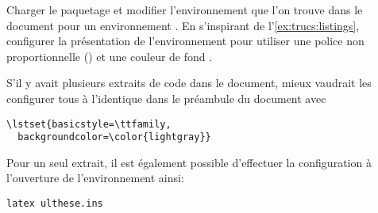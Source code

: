 \begin{exercice}
  \label{exercice:trucs:n}
  Charger le paquetage  et modifier l'environnement
   que l'on trouve dans le document pour un environnement
  . En s'inspirant de l'\autoref{ex:trucs:listings},
  configurer la présentation de l'environnement pour utiliser une
  police non proportionnelle (\cmdprint{\ttfamily}) et une couleur de
  fond .
  \begin{sol}
    S'il y avait plusieurs extraits de code dans le document, mieux
    vaudrait les configurer tous à l'identique dans le préambule du
    document avec
\begin{lstlisting}
\lstset{basicstyle=\ttfamily,
  backgroundcolor=\color{lightgray}}
\end{lstlisting}
    Pour un seul extrait, il est également possible d'effectuer la
    configuration à l'ouverture de l'environnement ainsi:
\begin{vglisting}
\begin{lstlisting}[basicstyle=\ttfamily,
  backgroundcolor=\color{lightgray}]
latex ulthese.ins
\end{lstlisting}
\end{vglisting}
  \end{sol}
\end{exercice}

